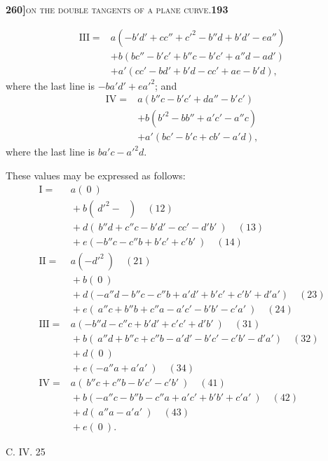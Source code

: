\documentclass[11pt]{article}
\begin{document}
\noindent\textbf{260]}\hfill\textsc{on the double tangents of a plane curve.}\hfill\textbf{193}

\medskip

\[
\begin{aligned}
\mathrm{III} = {}& a(-b'd' + cc'' + c'^2 - b''d + b'd' - ea'')\\
& + b(bc'' - b'c' + b''c - b'c' + a''d - ad')\\
& + a'(cc' - bd' + b'd - cc' + ae - b'd),
\end{aligned}
\]
where the last line is $-ba'd' + ea'^2$; and
\[
\begin{aligned}
\mathrm{IV} = {}& a(b''c - b'c' + da'' - b'c')\\
& + b(b'^2 - bb'' + a'c' - a''c)\\
& + a'(bc' - b'c + cb' - a'd),
\end{aligned}
\]
where the last line is $ba'c - a'^2 d$.

These values may be expressed as follows:
\[
\begin{array}{rl}
\mathrm{I} = & a(\ 0\ )\\
& {} + b(\ d'^2 - \ \ \ )\quad (12)\\
& {} + d(\ b''d + c''c - b'd' - cc' - d'b'\ )\quad (13)\\
& {} + e(-b''c - c''b + b'c' + c'b'\ )\quad (14)\\[4pt]
\mathrm{II} = & a(-d'^2\ )\quad (21)\\
& {} + b(\ 0\ )\\
& {} + d(-a''d - b''c - c''b + a'd' + b'c' + c'b' + d'a')\quad (23)\\
& {} + e(\ a''c + b''b + c''a - a'c' - b'b' - c'a'\ )\quad (24)\\[4pt]
\mathrm{III} = & a(-b''d - c''c + b'd' + c'c' + d'b'\ )\quad (31)\\
& {} + b(\ a''d + b''c + c''b - a'd' - b'c' - c'b' - d'a')\quad (32)\\
& {} + d(\ 0\ )\\
& {} + e(-a''a + a'a'\ )\quad (34)\\[4pt]
\mathrm{IV} = & a(\ b''c + c''b - b'c' - c'b'\ )\quad (41)\\
& {} + b(-a''c - b''b - c''a + a'c' + b'b' + c'a'\ )\quad (42)\\
& {} + d(\ a''a - a'a'\ )\quad (43)\\
& {} + e(\ 0\ ).
\end{array}
\]

\noindent\hfill C. IV. \hfill 25
\end{document}
